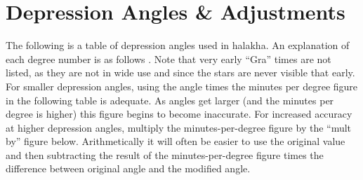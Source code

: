 \section{Depression Angles \& Adjustments}

The following is a table of depression angles used in halakha.  An explanation of each degree number is as follows \parencite{dvaryom}. Note that very early “Gra” times are not listed, as they are not in wide use and since the stars are never visible that early. For smaller depression angles, using the angle times the minutes per degree figure in the following table is adequate. As angles get larger (and the minutes per degree is higher) this figure begins to become inaccurate. For increased accuracy at higher depression angles, multiply the minutes-per-degree figure by the “mult by” figure below. Arithmetically it will often be easier to use the original value and then subtracting the result of the minutes-per-degree figure times the difference between original angle and the modified angle.

